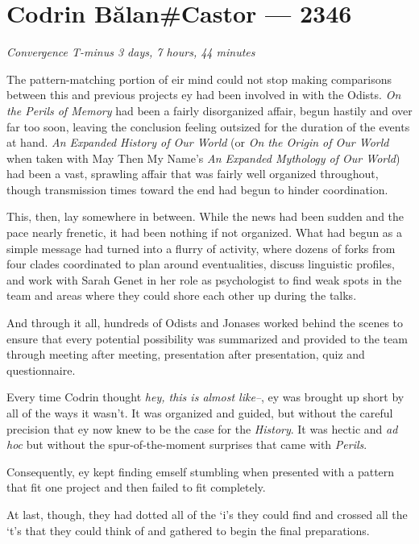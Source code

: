 \hypertarget{codrin-bux103lancastor-2346}{%
\chapter{Codrin Bălan\#Castor — 2346}\label{codrin-bux103lancastor-2346}}

\begin{center}
\emph{Convergence T-minus 3 days, 7 hours, 44 minutes}
\end{center}

\noindent The pattern-matching portion of eir mind could not stop making comparisons between this and previous projects ey had been involved in with the Odists. \emph{On the Perils of Memory} had been a fairly disorganized affair, begun hastily and over far too soon, leaving the conclusion feeling outsized for the duration of the events at hand. \emph{An Expanded History of Our World} (or \emph{On the Origin of Our World} when taken with May Then My Name's \emph{An Expanded Mythology of Our World}) had been a vast, sprawling affair that was fairly well organized throughout, though transmission times toward the end had begun to hinder coordination.

This, then, lay somewhere in between. While the news had been sudden and the pace nearly frenetic, it had been nothing if not organized. What had begun as a simple message had turned into a flurry of activity, where dozens of forks from four clades coordinated to plan around eventualities, discuss linguistic profiles, and work with Sarah Genet in her role as psychologist to find weak spots in the team and areas where they could shore each other up during the talks.

And through it all, hundreds of Odists and Jonases worked behind the scenes to ensure that every potential possibility was summarized and provided to the team through meeting after meeting, presentation after presentation, quiz and questionnaire.

Every time Codrin thought \emph{hey, this is almost like--}, ey was brought up short by all of the ways it wasn't. It was organized and guided, but without the careful precision that ey now knew to be the case for the \emph{History}. It was hectic and \emph{ad hoc} but without the spur-of-the-moment surprises that came with \emph{Perils}.

Consequently, ey kept finding emself stumbling when presented with a pattern that fit one project and then failed to fit completely.

At last, though, they had dotted all of the `i's they could find and crossed all the `t's that they could think of and gathered to begin the final preparations.

